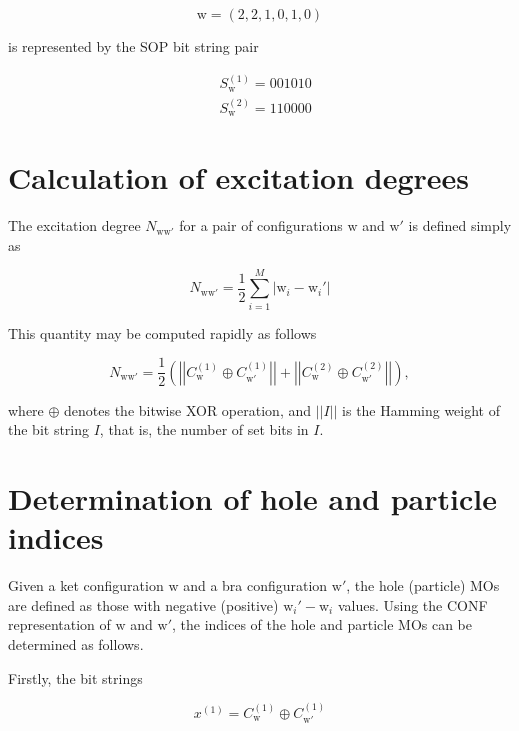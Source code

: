 \documentclass[12pt,a4paper]{report}
\begin{document}
\begin{equation*}
  \text{w} = (2,2,1,0,1,0)
\end{equation*}

\noindent
is represented by the SOP bit string pair

\begin{equation*}
  \begin{aligned}
    &S_{\text{w}}^{(1)} = 0 0 1 0 1 0 \\
    &S_{\text{w}}^{(2)} = 1 1 0 0 0 0
  \end{aligned}
\end{equation*}

\section{Calculation of excitation degrees}
The excitation degree $N_{\text{w}\text{w}'}$ for a pair of
configurations $\text{w}$ and $\text{w}'$ is defined simply as

\begin{equation}
  N_{\text{w}\text{w}'} = \frac{1}{2}\sum_{i=1}^{M} |\text{w}_{i} -
  \text{w}_{i}'|
\end{equation}

\noindent
This quantity may be computed rapidly as follows

\begin{equation}
  N_{\text{w}\text{w}'} = \frac{1}{2} \left( \left|\left|
  C_{\text{w}}^{(1)} \oplus C_{\text{w}'}^{(1)} \right|\right| +
  \left|\left| C_{\text{w}}^{(2)} \oplus C_{\text{w}'}^{(2)}
  \right|\right| \right),
\end{equation}

\noindent
where $\oplus$ denotes the bitwise XOR operation, and $||I||$ is the
Hamming weight of the bit string $I$, that is, the number of set bits
in $I$.

\section{Determination of hole and particle indices}
Given a ket configuration $\text{w}$ and a bra configuration
$\text{w}'$, the hole (particle) MOs are defined as those with
negative (positive) $\text{w}_{i}' - \text{w}_{i}$ values. Using the
CONF representation of $\text{w}$ and $\text{w}'$, the indices of the
hole and particle MOs can be determined as follows.

Firstly, the bit strings

\begin{equation}
  x^{(1)} = C_{\text{w}}^{(1)} \oplus C_{\text{w}'}^{(1)}
\end{equation}
\end{document}

